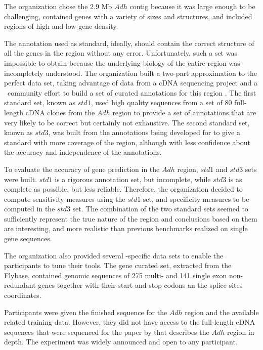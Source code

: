 The organization chose the 2.9 Mb $Adh$ contig because it was large
enough to be challenging, contained genes with a variety of sizes and
structures, and included regions of high and low gene density.

The annotation used as standard, ideally, should contain the correct
structure of all the genes in the region without any error.
Unfortunately, such a set was impossible to obtain because the
underlying biology of the entire region was incompletely understood.
The organization built a two-part approximation to the perfect data
set, taking advantage of data from a cDNA sequencing project and a
\Droso\ community effort to build a set of curated annotations for
this region \citep{ashburner:1999a}. The first standard set, known as
$std1$, used high quality sequences from a set of 80 full-length cDNA
clones from the $Adh$ region to provide a set of annotations that are
very likely to be correct but certainly not exhaustive. The second
standard set, known as $std3$, was built from the annotations being
developed for \cite{ashburner:1999a} to give a standard with more
coverage of the region, although with less confidence about the
accuracy and independence of the annotations.

To evaluate the accuracy of gene prediction in the $Adh$ region,
$std1$ and $std3$ sets were built. $std1$ is a rigorous annotation
set, but incomplete, while $std3$ is as complete as possible, but less
reliable. Therefore, the organization decided to compute sensitivity
measures using the $std1$ set, and specificity measures to be computed
in the $std3$ set. The combination of the two standard sets seemed to
sufficiently represent the true nature of the region and conclusions
based on them are interesting, and more realistic than previous
benchmarks realized on single gene sequences.

The organization also provided several \Droso-specific data sets to
enable the participants to tune their tools. The gene curated set,
extracted from the Flybase, contained genomic sequences of 275
multi- and 141 single exon non-redundant genes together with their
start and stop codons an the splice sites coordinates.

Participants were given the finished sequence for the $Adh$ region and
the available related training data. However, they did not have access to
the full-length cDNA sequences that were sequenced for the paper by
\cite{ashburner:1999a} that describes the $Adh$ region in depth. The
experiment was widely announced and open to any participant.


